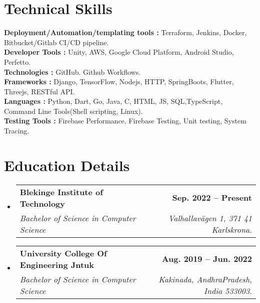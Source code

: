 \documentclass[letterpaper,11pt]{article}
\makeatletter
\newcommand{\resumeSubheading}[4]{
  \vspace{-2pt}\item
    \begin{tabular*}{1.0\textwidth}[t]{l@{\extracolsep{\fill}}r}
      \textbf{#1} & \textbf{\small #2} \\
      \textit{\small#3} & \textit{\small #4} \\
    \end{tabular*}\vspace{-7pt}
}
\newcommand{\resumeSubHeadingListStart}{\begin{itemize}[leftmargin=0.0in, label={}]}
\newcommand{\resumeSubHeadingListEnd}{\end{itemize}}
\makeatother
\begin{document}
\section{Technical Skills}
 \begin{itemize}[leftmargin=0.15in, label={}]
    \small{\item{
     \textbf{Deployment/Automation/templating tools : }{Terraform, Jenkins, Docker, Bitbucket/Gitlab CI/CD pipeline.} \\
     \textbf{Developer Tools : }{Unity, AWS, Google Cloud Platform, Android Studio, Perfetto.} \\
     \textbf{Technologies : }{ GitHub. Github Workflows.} \\
     \textbf{Frameworks : }{Django, TensorFlow, Nodejs, HTTP, SpringBoots, Flutter, Threejs, RESTful API.}\\
     \textbf{Languages : }{ Python, Dart, Go, Java, C, HTML, JS, SQL,TypeScript, Command Line Tools(Shell scripting, Linux).}\\
     \textbf{Testing Tools : }{Firebase Performance, Firebase Testing, Unit testing, System Tracing. }\\
    }}
 \end{itemize}
\section{Education Details}
  \resumeSubHeadingListStart
    \resumeSubheading
      {Blekinge Institute of Technology}{Sep. 2022 -- Present}
      {Bachelor of Science in Computer Science}{Valhallavägen 1, 371 41 Karlskrona.}
  \resumeSubHeadingListEnd

  \resumeSubHeadingListStart
    \resumeSubheading
      {University College Of Engineering Jntuk}{Aug. 2019 -- Jun. 2022}
      {Bachelor of Science in Computer Science}{Kakinada, AndhraPradesh, India 533003.}
  \resumeSubHeadingListEnd

%


\end{document}
